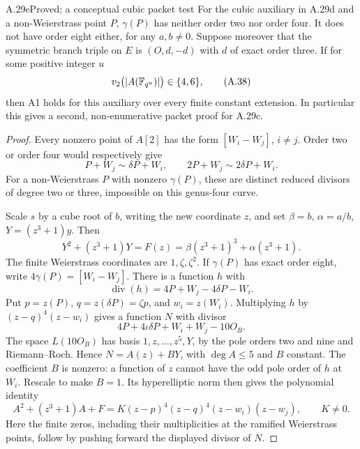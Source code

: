 \begin{claim}{A.29e}{Proved; a conceptual cubic packet test}
For the cubic auxiliary in A.29d and a non-Weierstrass
point $P$, $\gamma(P)$ has neither order two nor order four.
It does not have order eight either, for any $a,b\ne0$.
Suppose moreover that the symmetric branch triple
on $E$ is $(O,d,-d)$ with $d$ of exact order three.
If for some positive integer $u$
\[
 v_2\bigl(|A(\mathbb F_{q^u})|\bigr)\in\{4,6\},              \tag{A.38}
\]
then A1 holds for this auxiliary over every finite
constant extension. In particular this gives a
second, non-enumerative packet proof for A.29c.
\end{claim}
\begin{proof}
Every nonzero point of $A[2]$ has the form
$[W_i-W_j]$, $i\ne j$. Order two or order four
would respectively give
\[
 P+W_j\sim\delta P+W_i,
 \qquad 2P+W_j\sim2\delta P+W_i.
\]
For a non-Weierstrass $P$ with nonzero $\gamma(P)$,
these are distinct reduced divisors of degree two
or three, impossible on this genus-four curve.

Scale $s$ by a cube root of $b$, writing the new
coordinate $z$, and set
$\beta=b$, $\alpha=a/b$, $Y=(z^3+1)y$. Then
\[
 Y^2+(z^3+1)Y
      =F(z)=\beta(z^3+1)^3+\alpha(z^3+1).              \tag{A.39}
\]
The finite Weierstrass coordinates are $1,\zeta,\zeta^2$.
If $\gamma(P)$ has exact order eight, write
$4\gamma(P)=[W_i-W_j]$. There is a function $h$ with
\[
 \operatorname{div}(h)=4P+W_j-4\delta P-W_i.
\]
Put $p=z(P)$, $q=z(\delta P)=\zeta p$, and
$w_i=z(W_i)$. Multiplying $h$ by
$(z-q)^4(z-w_i)$ gives a function $N$ with divisor
\[
 4P+4\iota\delta P+W_i+W_j-10O_B.
\]
The space $L(10O_B)$ has basis $1,z,\ldots,z^5,Y$,
by the pole orders two and nine and Riemann--Roch.
Hence $N=A(z)+B Y$, with $\deg A\le5$ and $B$
constant. The coefficient $B$ is nonzero: a function
of $z$ cannot have the odd pole order of $h$ at
$W_i$. Rescale to make $B=1$. Its hyperelliptic norm
then gives the polynomial identity
\[
 A^2+(z^3+1)A+F
   =K(z-p)^4(z-q)^4(z-w_i)(z-w_j),\qquad K\ne0.        \tag{A.40}
\]
Here the finite zeros, including their multiplicities
at the ramified Weierstrass points, follow by pushing
forward the displayed divisor of $N$.


\end{proof}
